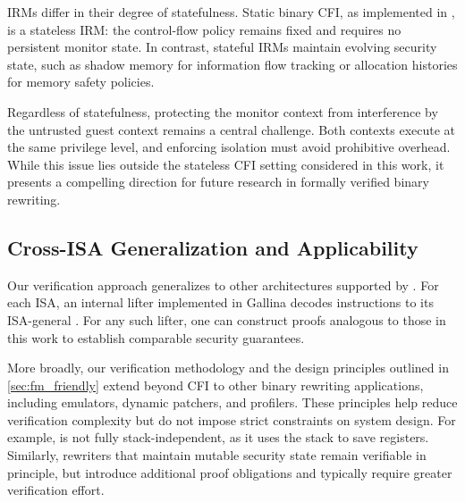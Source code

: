 IRMs differ in their degree of statefulness. Static binary CFI, as implemented in \pname, is a stateless IRM: the control-flow policy remains fixed and requires no persistent monitor state. In contrast, stateful IRMs maintain evolving security state, such as shadow memory for information flow tracking or allocation histories for memory safety policies.

Regardless of statefulness, protecting the monitor context from interference by the untrusted guest context remains a central challenge. Both contexts execute at the same privilege level, and enforcing isolation must avoid prohibitive overhead. While this issue lies outside the stateless CFI setting considered in this work, it presents a compelling direction for future research in formally verified binary rewriting.

\subsection{Cross-ISA Generalization and Applicability}
Our verification approach generalizes to other architectures supported by \Picinae{}. For each ISA, an internal lifter implemented in Gallina decodes instructions to its ISA-general \IL. For any such lifter, one can construct proofs analogous to those in this work to establish comparable security guarantees.

More broadly, our verification methodology and the design principles outlined in \autoref{sec:fm_friendly} extend beyond CFI to other binary rewriting applications, including emulators, dynamic patchers, and profilers. These principles help reduce verification complexity but do not impose strict constraints on system design.
%
For example, \pname is not fully stack-independent, as it uses the stack to save registers. Similarly, rewriters that maintain mutable security state remain verifiable in principle, but introduce additional proof obligations and typically require greater verification effort.
